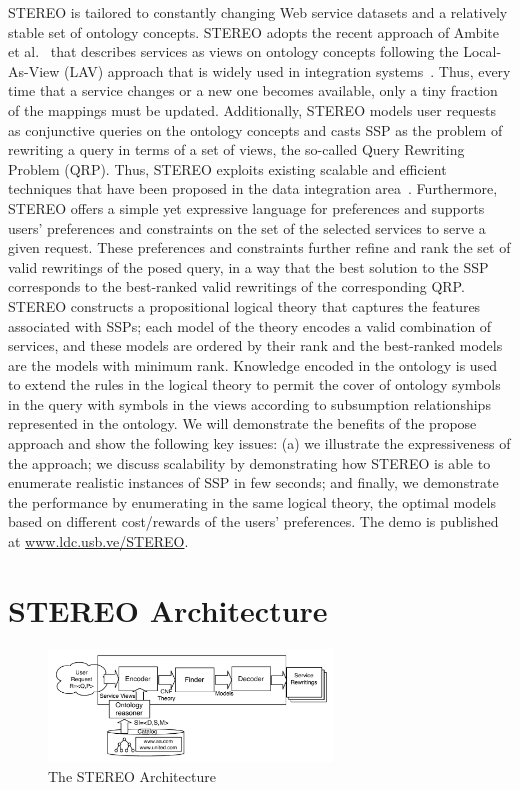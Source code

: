 \documentclass{llncs}
\begin{document}
 STEREO is tailored to constantly changing Web service datasets and a relatively stable set of ontology concepts. STEREO adopts  the recent approach of Ambite et al.\ \cite{AmbiteISWC09}
that describes services as views on ontology concepts following the Local-As-View (LAV) approach that is widely used in integration
systems~\cite{levy:bucket}. Thus, every time that a service changes or
a new one becomes available, only a tiny fraction of the mappings
must be updated. Additionally,   STEREO models user requests  as conjunctive queries on the ontology concepts and casts  SSP  as the problem
of rewriting a query in terms of a set of views, the so-called Query
Rewriting Problem (QRP). Thus, STEREO exploits existing scalable and efficient techniques that have been proposed in the data integration area~\cite{arvelo:aaai06,levy:bucket,pottinger:minicon}.
Furthermore, STEREO offers a simple yet expressive language for preferences and supports users' preferences and constraints on the set of the
selected services to serve a given request. 
These preferences and constraints further refine and rank 
the set of valid rewritings of the posed query, in a way that
the best solution to the SSP corresponds to the best-ranked 
valid rewritings of the corresponding QRP. STEREO  constructs a propositional logical theory  that captures 
the features associated with SSPs; each model of the theory encodes a valid combination of services, and these models are ordered by their rank and the best-ranked
models are the models with minimum rank. Knowledge encoded in the ontology is used to extend the rules in the logical theory to permit the cover of ontology symbols in
the query with symbols in the views according to subsumption relationships represented in the ontology. 
We will demonstrate the benefits of the propose approach and show the following key issues: (a) we illustrate the expressiveness of the approach; we discuss scalability  by demonstrating how STEREO is able to enumerate realistic instances of SSP in few seconds; and finally, we demonstrate the performance  by enumerating in the same logical theory, the optimal models based on different cost/rewards of the users' preferences.  The demo is published at \url{www.ldc.usb.ve/STEREO}.
 
 
\section{STEREO Architecture}
\begin{figure}[t]
\centering
\includegraphics[height=30mm,width=.6\textwidth]{architecture.pdf}
\caption{The STEREO Architecture}
\label{fig:architecture}
\end{figure}
\end{document}
